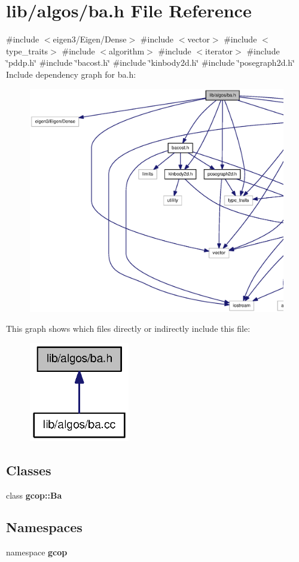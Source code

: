 \section{lib/algos/ba.h \-File \-Reference}
\label{ba_8h}
{\ttfamily \#include $<$eigen3/\-Eigen/\-Dense$>$}\*
{\ttfamily \#include $<$vector$>$}\*
{\ttfamily \#include $<$type\-\_\-traits$>$}\*
{\ttfamily \#include $<$algorithm$>$}\*
{\ttfamily \#include $<$iterator$>$}\*
{\ttfamily \#include \char`\"{}pddp.\-h\char`\"{}}\*
{\ttfamily \#include \char`\"{}bacost.\-h\char`\"{}}\*
{\ttfamily \#include \char`\"{}kinbody2d.\-h\char`\"{}}\*
{\ttfamily \#include \char`\"{}posegraph2d.\-h\char`\"{}}\*
\-Include dependency graph for ba.\-h\-:\nopagebreak
\begin{figure}[H]
\begin{center}
\leavevmode
\includegraphics[width=350pt]{ba_8h__incl}
\end{center}
\end{figure}
\-This graph shows which files directly or indirectly include this file\-:\nopagebreak
\begin{figure}[H]
\begin{center}
\leavevmode
\includegraphics[width=124pt]{ba_8h__dep__incl}
\end{center}
\end{figure}
\subsection*{\-Classes}
\begin{DoxyCompactItemize}
\item 
class {\bf gcop\-::\-Ba}
\end{DoxyCompactItemize}
\subsection*{\-Namespaces}
\begin{DoxyCompactItemize}
\item 
namespace {\bf gcop}
\end{DoxyCompactItemize}
